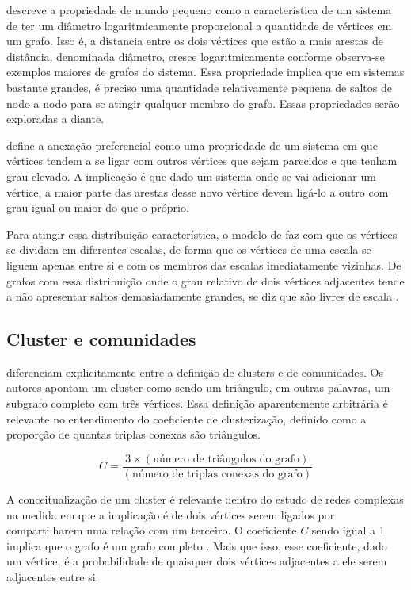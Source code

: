 \documentclass[notes.tex]{subfiles}
\begin{document}
 descreve a propriedade de mundo pequeno como a característica de um sistema de ter um diâmetro logaritmicamente proporcional a quantidade de vértices em um grafo.
Isso é, a distancia entre os dois vértices que estão a mais arestas de distância, denominada diâmetro, cresce logaritmicamente conforme observa-se exemplos maiores de grafos do sistema.
Essa propriedade implica que em sistemas bastante grandes, é preciso uma quantidade relativamente pequena de saltos de nodo a nodo para se atingir qualquer membro do grafo.
Essas propriedades serão exploradas a diante.

 define a anexação preferencial como uma propriedade de um sistema em que vértices tendem a se ligar com outros vértices que sejam parecidos e que tenham grau elevado.
A implicação é que dado um sistema onde se vai adicionar um vértice, a maior parte das arestas desse novo vértice devem ligá-lo a outro com grau igual ou maior do que o próprio.

Para atingir essa distribuição característica, o modelo de  faz com que os vértices se dividam em diferentes escalas, de forma que os vértices de uma escala se liguem apenas entre si e com os membros das escalas imediatamente vizinhas.
De grafos com essa distribuição onde o grau relativo de dois vértices adjacentes tende a não apresentar saltos demasiadamente grandes, se diz que são livres de escala \cite{largeron2015generating}.

\subsection{Cluster e comunidades}

 diferenciam explicitamente entre a definição de clusters e de comunidades.
Os autores apontam um cluster como sendo um triângulo, em outras palavras, um subgrafo completo com três vértices.
Essa definição aparentemente arbitrária é relevante no entendimento do coeficiente de clusterização, definido como a proporção de quantas triplas conexas são triângulos.


\begin{equation}\label{eq:coef_clus}
    C = \frac{3 \times (\text{número de triângulos do grafo})}{(\text{número de triplas conexas do grafo})}
\end{equation}


A conceitualização de um cluster é relevante dentro do estudo de redes complexas na medida em que a implicação é de dois vértices serem ligados por compartilharem uma relação com um terceiro.
O coeficiente $C$ sendo igual a 1 implica que o grafo é um grafo completo \cite{girvan2002community}.
Mais que isso, esse coeficiente, dado um vértice, é a probabilidade de quaisquer dois vértices adjacentes a ele serem adjacentes entre si.
\end{document}
